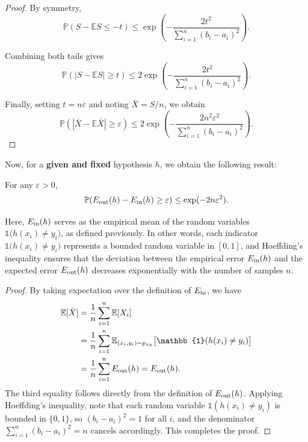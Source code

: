 \documentclass[../main]{subfiles}
\begin{document}
\begin{proof}
    By symmetry,
    \begin{equation}
    \mathbb{P}(S - \mathbb{E}S \le -t)
    \le \exp\left(-\frac{2t^2}{\sum_{i=1}^n (b_i - a_i)^2}\right).
    \end{equation}
    
    Combining both tails gives
    \begin{equation}
    \mathbb{P}\!\left(|S - \mathbb{E}S| \ge t\right)
    \le 2\exp\left(-\frac{2t^2}{\sum_{i=1}^n (b_i - a_i)^2}\right).
    \end{equation}
    
    Finally, setting $t = n\varepsilon$ and noting $\bar X = S/n$, we obtain
    \begin{equation}
    \mathbb{P}\!\left(|\bar X - \mathbb{E}\bar X| \ge \varepsilon\right)
    \le 2\exp\left(-\frac{2n^2\varepsilon^2}{\sum_{i=1}^n (b_i - a_i)^2}\right).
    \end{equation}
\end{proof}
Now, for a \textbf{given and fixed} hypothesis $h$, we obtain the following result:

\begin{theorem}
For any $\varepsilon > 0$,
\begin{equation}
    \mathbb{P}\!\left(E_{\rm out}(h) - E_{\rm in}(h) \ge \varepsilon\right)
    \le \exp(-2n\varepsilon^2).
\end{equation}
\end{theorem}

Here, $E_{\rm in}(h)$ serves as the empirical mean of the random variables  
$\mathbb{1}\!\big(h(x_i) \neq y_i\big)$, as defined previously.  
In other words, each indicator $\mathbb{1}\!\big(h(x_i) \neq y_i\big)$ represents a bounded random variable in $[0,1]$,  
and Hoeffding’s inequality ensures that the deviation between the empirical error $E_{\rm in}(h)$  
and the expected error $E_{\rm out}(h)$ decreases exponentially with the number of samples $n$.
\begin{proof}
    By taking expectation over the definition of $E_{\rm in}$, we have
    \begin{align*}
        \mathbb{E}[\bar{X}]
        &= \frac{1}{n}\sum_{i=1}^n \mathbb{E}[X_i] \\
        &= \frac{1}{n}\sum_{i=1}^n \mathbb{E}_{(x_i,y_i)\sim p_{xy}}
           \big[\mathbb{1}(h(x_i)\neq y_i)\big] \\
        &= \frac{1}{n}\sum_{i=1}^n E_{\rm out}(h)
        = E_{\rm out}(h).
    \end{align*}
    The third equality follows directly from the definition of $E_{\rm out}(h)$.  
    Applying Hoeffding’s inequality, note that each random variable $\mathbb{1}(h(x_i)\neq y_i)$ is bounded in $\{0,1\}$,  
    so $(b_i - a_i)^2 = 1$ for all $i$, and the denominator $\sum_{i=1}^n (b_i - a_i)^2 = n$ cancels accordingly.  
    This completes the proof.
    \end{proof}
    
\end{document}
